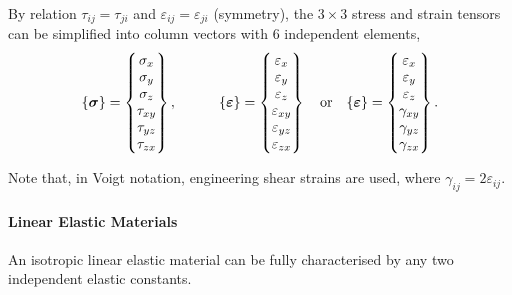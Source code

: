 \documentclass[12pt, a4paper]{article}
\numberwithin{equation}{section}
\begin{document}
By relation $\tau_{ij} = \tau_{ji}$ and $\varepsilon_{ij} = \varepsilon_{ji}$ (symmetry), the $3 \times 3$ stress and strain tensors can be simplified into column vectors with 6 independent elements, 
\begin{equation}
    \{\boldsymbol{\sigma}\} = 
    \begin{Bmatrix}
        \sigma_{x} \\
        \sigma_{y} \\
        \sigma_{z} \\
        \tau_{xy} \\
        \tau_{yz} \\
        \tau_{zx} 
    \end{Bmatrix},
    \quad \quad \quad
    \{\boldsymbol{\varepsilon}\} = 
    \begin{Bmatrix}
        \varepsilon_{x} \\
        \varepsilon_{y} \\
        \varepsilon_{z} \\
        \varepsilon_{xy} \\
        \varepsilon_{yz} \\
        \varepsilon_{zx} 
    \end{Bmatrix}
    \quad \text{or} \quad
    \{\boldsymbol{\varepsilon}\} = 
    \begin{Bmatrix}
        \varepsilon_{x} \\
        \varepsilon_{y} \\
        \varepsilon_{z} \\
        \gamma_{xy} \\
        \gamma_{yz} \\
        \gamma_{zx} 
    \end{Bmatrix}.
\end{equation}

Note that, in Voigt notation, engineering shear strains are used, where $\gamma_{ij} = 2\varepsilon_{ij}$.

\paragraph{Linear Elastic Materials}
An isotropic linear elastic material can be fully characterised by any two independent elastic constants.
\end{document}
